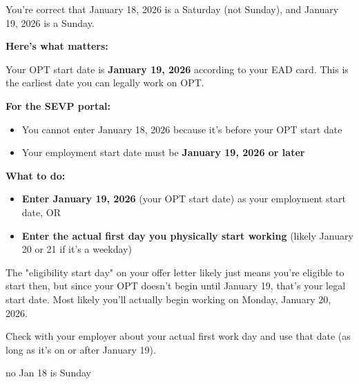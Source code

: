 \begin{botresponse}
You're correct that January 18, 2026 is a Saturday (not Sunday), and January 19, 2026 is a Sunday.

\textbf{Here's what matters:}

Your OPT start date is \textbf{January 19, 2026} according to your EAD card. This is the earliest date you can legally work on OPT.

\textbf{For the SEVP portal:}

\begin{itemize}
\item You cannot enter January 18, 2026 because it's before your OPT start date
\item Your employment start date must be \textbf{January 19, 2026 or later}
\end{itemize}

\textbf{What to do:}

\begin{itemize}
\item \textbf{Enter January 19, 2026} (your OPT start date) as your employment start date, OR
\item \textbf{Enter the actual first day you physically start working} (likely January 20 or 21 if it's a weekday)
\end{itemize}

The "eligibility start day" on your offer letter likely just means you're eligible to start then, but since your OPT doesn't begin until January 19, that's your legal start date. Most likely you'll actually begin working on Monday, January 20, 2026.

Check with your employer about your actual first work day and use that date (as long as it's on or after January 19).
\end{botresponse}

\begin{userprompt}
no Jan 18 is Sunday
\end{userprompt}

